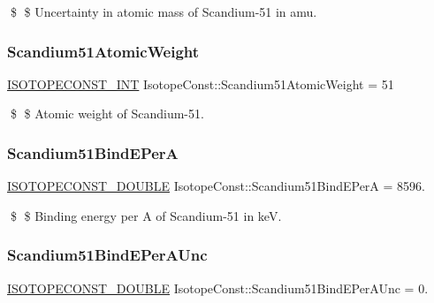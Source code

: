 \$ \$ Uncertainty in atomic mass of Scandium-\/51 in amu. \mbox{\label{group___isotope_const-_scandium-_sc51_gaa91954f4dd677dffe8b75f879c211f35}} 
\subsubsection{\texorpdfstring{Scandium51\+Atomic\+Weight}{Scandium51AtomicWeight}}
{\footnotesize\ttfamily \mbox{\hyperlink{group___isotope_const-_macros_ga5f18360b3e99483a35c32d789e62621c}{I\+S\+O\+T\+O\+P\+E\+C\+O\+N\+S\+T\+\_\+\+I\+NT}} Isotope\+Const\+::\+Scandium51\+Atomic\+Weight = 51}

\$ \$ Atomic weight of Scandium-\/51. \mbox{\label{group___isotope_const-_scandium-_sc51_gaf34902fb41945b220d03df7fdfb58a43}} 
\subsubsection{\texorpdfstring{Scandium51\+Bind\+E\+PerA}{Scandium51BindEPerA}}
{\footnotesize\ttfamily \mbox{\hyperlink{group___isotope_const-_macros_ga8f45a7272ce02c0b4c65c44636ed719a}{I\+S\+O\+T\+O\+P\+E\+C\+O\+N\+S\+T\+\_\+\+D\+O\+U\+B\+LE}} Isotope\+Const\+::\+Scandium51\+Bind\+E\+PerA = 8596.}

\$ \$ Binding energy per A of Scandium-\/51 in keV. \mbox{\label{group___isotope_const-_scandium-_sc51_ga86552fee6ce013ad2db671916a3f47bc}} 
\subsubsection{\texorpdfstring{Scandium51\+Bind\+E\+Per\+A\+Unc}{Scandium51BindEPerAUnc}}
{\footnotesize\ttfamily \mbox{\hyperlink{group___isotope_const-_macros_ga8f45a7272ce02c0b4c65c44636ed719a}{I\+S\+O\+T\+O\+P\+E\+C\+O\+N\+S\+T\+\_\+\+D\+O\+U\+B\+LE}} Isotope\+Const\+::\+Scandium51\+Bind\+E\+Per\+A\+Unc = 0.}

